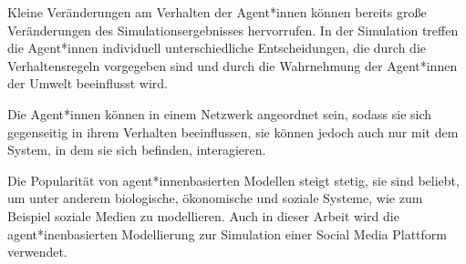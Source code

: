 Kleine Veränderungen am Verhalten der Agent*innen können bereits große Veränderungen des Simulationsergebnisses hervorrufen. In der Simulation treffen die Agent*innen individuell unterschiedliche Entscheidungen, die durch die Verhaltensregeln vorgegeben sind und durch die Wahrnehmung der Agent*innen der Umwelt beeinflusst wird.

Die Agent*innen können in einem Netzwerk angeordnet sein, sodass sie sich gegenseitig in ihrem Verhalten beeinflussen, sie können jedoch auch nur mit dem System, in dem sie sich befinden, interagieren.


Die Popularität von agent*innenbasierten Modellen steigt stetig, sie sind beliebt, um unter anderem biologische, ökonomische und soziale Systeme, wie zum Beispiel soziale Medien zu modellieren. Auch in dieser Arbeit wird die agent*inenbasierten Modellierung zur Simulation einer Social Media Plattform verwendet.